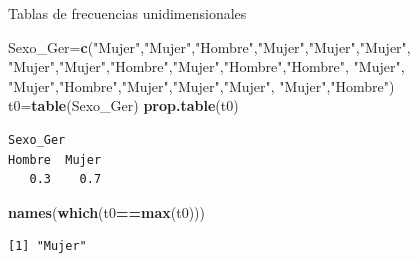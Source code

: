 \documentclass[
  ignorenonframetext,
  aspectratio=169]{beamer}
\newenvironment{Shaded}{\begin{snugshade}}{\end{snugshade}}
\newcommand{\FunctionTok}[1]{\textcolor[rgb]{0.13,0.29,0.53}{\textbf{#1}}}
\newcommand{\NormalTok}[1]{#1}
\newcommand{\OtherTok}[1]{\textcolor[rgb]{0.56,0.35,0.01}{#1}}
\newcommand{\SpecialCharTok}[1]{\textcolor[rgb]{0.81,0.36,0.00}{\textbf{#1}}}
\newcommand{\StringTok}[1]{\textcolor[rgb]{0.31,0.60,0.02}{#1}}
\begin{document}
\begin{frame}[fragile]{Tablas de frecuencias unidimensionales}
\label{tablas-de-frecuencias-unidimensionales-15}
\begin{Shaded}
\begin{Highlighting}[]
\NormalTok{Sexo\_Ger}\OtherTok{=}\FunctionTok{c}\NormalTok{(}\StringTok{"Mujer"}\NormalTok{,}\StringTok{"Mujer"}\NormalTok{,}\StringTok{"Hombre"}\NormalTok{,}\StringTok{"Mujer"}\NormalTok{,}\StringTok{"Mujer"}\NormalTok{,}\StringTok{"Mujer"}\NormalTok{,}
           \StringTok{"Mujer"}\NormalTok{,}\StringTok{"Mujer"}\NormalTok{,}\StringTok{"Hombre"}\NormalTok{,}\StringTok{"Mujer"}\NormalTok{,}\StringTok{"Hombre"}\NormalTok{,}\StringTok{"Hombre"}\NormalTok{,}
           \StringTok{"Mujer"}\NormalTok{, }\StringTok{"Mujer"}\NormalTok{,}\StringTok{"Hombre"}\NormalTok{,}\StringTok{"Mujer"}\NormalTok{,}\StringTok{"Mujer"}\NormalTok{,}\StringTok{"Mujer"}\NormalTok{,}
           \StringTok{"Mujer"}\NormalTok{,}\StringTok{"Hombre"}\NormalTok{)}
\NormalTok{t0}\OtherTok{=}\FunctionTok{table}\NormalTok{(Sexo\_Ger)}
\FunctionTok{prop.table}\NormalTok{(t0) }
\end{Highlighting}
\end{Shaded}

\begin{verbatim}
Sexo_Ger
Hombre  Mujer 
   0.3    0.7 
\end{verbatim}

\begin{Shaded}
\begin{Highlighting}[]
\FunctionTok{names}\NormalTok{(}\FunctionTok{which}\NormalTok{(t0}\SpecialCharTok{==}\FunctionTok{max}\NormalTok{(t0))) }
\end{Highlighting}
\end{Shaded}

\begin{verbatim}
[1] "Mujer"
\end{verbatim}
\end{frame}
\end{document}
